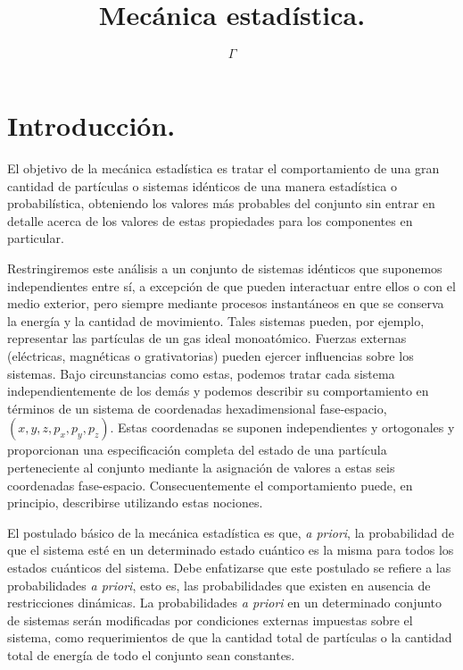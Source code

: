 \documentclass[12pt,a4paper]{article}
\begin{document}
\title{Mecánica estadística.}

\author{$\Gamma$}

\maketitle

\section{Introducción.}

El objetivo de la mecánica estadística es tratar el comportamiento de una gran cantidad de partículas o sistemas idénticos de una manera estadística o probabilística, obteniendo los valores más probables del conjunto sin entrar en detalle acerca de los valores de estas propiedades para los componentes en particular.

Restringiremos este análisis a un conjunto de sistemas idénticos que suponemos independientes entre sí, a excepción de que pueden interactuar entre ellos o con el medio exterior, pero siempre mediante procesos instantáneos en que se conserva la energía y la cantidad de movimiento. Tales sistemas pueden, por ejemplo, representar las partículas de un gas ideal monoatómico. Fuerzas externas (eléctricas, magnéticas o grativatorias) pueden ejercer influencias sobre los sistemas. Bajo circunstancias como estas, podemos tratar cada sistema independientemente de los demás y podemos describir su comportamiento en términos de un sistema de coordenadas hexadimensional fase-espacio, $(x,y,z,p_{x},p_{y},p_{z})$. Estas coordenadas se suponen independientes y ortogonales y proporcionan una especificación completa del estado de una partícula perteneciente al conjunto mediante la asignación de valores a estas seis coordenadas fase-espacio. Consecuentemente el comportamiento puede, en principio, describirse utilizando estas nociones.

El postulado básico de la mecánica estadística es que, \emph{a priori}, la probabilidad de que el sistema esté en un determinado estado cuántico es la misma para todos los estados cuánticos del sistema. Debe enfatizarse que este postulado se refiere a las probabilidades \emph{a priori}, esto es, las probabilidades que existen en ausencia de restricciones dinámicas. La probabilidades \emph{a priori} en un determinado conjunto de sistemas serán modificadas por condiciones externas impuestas sobre el sistema, como requerimientos de que la cantidad total de partículas o la cantidad total de energía de todo el conjunto sean constantes.
\end{document}
